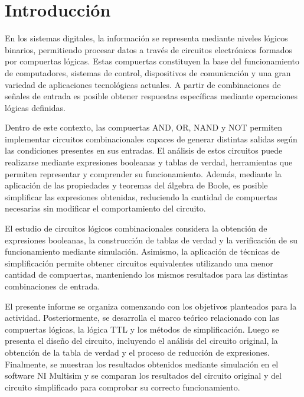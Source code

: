 \documentclass[12pt,letterpaper]{article}
\begin{document}
	\tableofcontents 

	\newpage
	\section{Introducción}

    En los sistemas digitales, la información se representa mediante niveles lógicos binarios, permitiendo procesar datos a través de circuitos electrónicos formados por compuertas lógicas. Estas compuertas constituyen la base del funcionamiento de computadores, sistemas de control, dispositivos de comunicación y una gran variedad de aplicaciones tecnológicas actuales. A partir de combinaciones de señales de entrada es posible obtener respuestas específicas mediante operaciones lógicas definidas.

    Dentro de este contexto, las compuertas AND, OR, NAND y NOT permiten implementar circuitos combinacionales capaces de generar distintas salidas según las condiciones presentes en sus entradas. El análisis de estos circuitos puede realizarse mediante expresiones booleanas y tablas de verdad, herramientas que permiten representar y comprender su funcionamiento. Además, mediante la aplicación de las propiedades y teoremas del álgebra de Boole, es posible simplificar las expresiones obtenidas, reduciendo la cantidad de compuertas necesarias sin modificar el comportamiento del circuito.

    El estudio de circuitos lógicos combinacionales considera la obtención de expresiones booleanas, la construcción de tablas de verdad y la verificación de su funcionamiento mediante simulación. Asimismo, la aplicación de técnicas de simplificación permite obtener circuitos equivalentes utilizando una menor cantidad de compuertas, manteniendo los mismos resultados para las distintas combinaciones de entrada.

    El presente informe se organiza comenzando con los objetivos planteados para la actividad. Posteriormente, se desarrolla el marco teórico relacionado con las compuertas lógicas, la lógica TTL y los métodos de simplificación. Luego se presenta el diseño del circuito, incluyendo el análisis del circuito original, la obtención de la tabla de verdad y el proceso de reducción de expresiones. Finalmente, se muestran los resultados obtenidos mediante simulación en el software NI Multisim y se comparan los resultados del circuito original y del circuito simplificado para comprobar su correcto funcionamiento.
\end{document}
